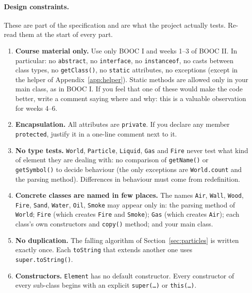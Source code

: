\documentclass[11pt,a4paper]{article}
\newcommand{\code}[1]{\texttt{#1}}
\begin{document}
\paragraph{Design constraints.} These are part of the specification and are what the project
actually tests. Re-read them at the start of every part.
\begin{enumerate}[label=\textbf{R\arabic*.},leftmargin=2.6em]
  \item \textbf{Course material only.} Use only BOOC I and weeks 1--3 of BOOC II. In particular:
        no \code{abstract}, no \code{interface}, no \code{instanceof}, no casts between class
        types, no \code{getClass()}, no \code{static} attributes, no exceptions (except in the
        helper of Appendix~\ref{app:helper}). Static methods are allowed only in your main class,
        as in BOOC I. If you feel that one of these would make the code better, write a comment
        saying where and why: this is a valuable observation for weeks 4--6.
  \item \textbf{Encapsulation.} All attributes are \code{private}. If you declare any member
        \code{protected}, justify it in a one-line comment next to it.
  \item \textbf{No type tests.} \code{World}, \code{Particle}, \code{Liquid}, \code{Gas} and
        \code{Fire} never test what kind of element they are dealing with: no comparison of
        \code{getName()} or \code{getSymbol()} to decide behaviour (the only exceptions are
        \code{World.count} and the parsing method). Differences in behaviour must come from
        redefinition.
  \item \textbf{Concrete classes are named in few places.} The names \code{Air}, \code{Wall},
        \code{Wood}, \code{Fire}, \code{Sand}, \code{Water}, \code{Oil}, \code{Smoke} may appear only
        in: the parsing method of \code{World}; \code{Fire} (which creates \code{Fire} and
        \code{Smoke}); \code{Gas} (which creates \code{Air}); each class's own constructors and
        \code{copy()} method; and your main class.
  \item \textbf{No duplication.} The falling algorithm of Section~\ref{sec:particles} is written
        exactly once. Each \code{toString} that extends another one uses \code{super.toString()}.
  \item \textbf{Constructors.} \code{Element} has no default constructor. Every constructor of
        every sub-class begins with an explicit \code{super(\ldots)} or \code{this(\ldots)}.
\end{enumerate}
\end{document}
